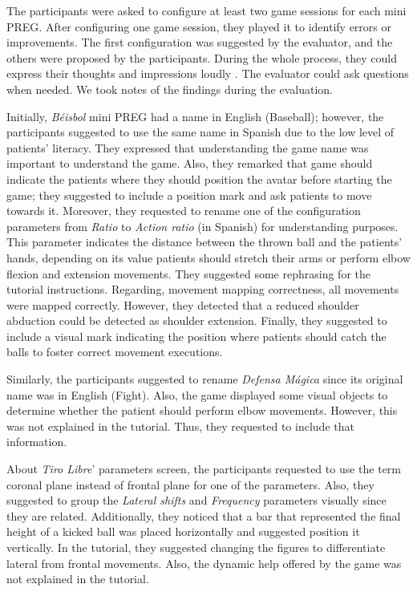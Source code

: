 The participants were asked to configure at least two game sessions for each mini \ac{PREG}. After configuring one game session, they played it to identify errors or improvements. The first configuration was suggested by the evaluator, and the others were proposed by the participants. During the whole process, they could express their thoughts and impressions loudly . The evaluator could ask questions when needed. We took notes of the findings during the evaluation.

Initially, \textit{Béisbol} mini \ac{PREG} had a name in English (Baseball); however, the participants suggested to use the same name in Spanish due to the low level of patients' literacy. They expressed that understanding the game name was important to understand the game. Also, they remarked that game should indicate the patients where they should position the avatar before starting the game; they suggested to include a position mark and ask patients to move towards it. Moreover, they requested to rename one of the configuration parameters from \textit{Ratio} to \textit{Action ratio} (in Spanish) for understanding purposes. This parameter indicates the distance between the thrown ball and the patients' hands, depending on its value patients should stretch their arms or perform elbow flexion and extension movements. They suggested some rephrasing for the tutorial instructions. Regarding, movement mapping correctness, all movements were mapped correctly. However, they detected that a reduced shoulder abduction could be detected as shoulder extension. Finally, they suggested to include a visual mark indicating the position where patients should catch the balls to foster correct movement executions.

Similarly, the participants suggested to rename \textit{Defensa M\'agica} since its original name was in English (Fight). Also, the game displayed some visual objects to determine whether the patient should perform elbow movements. However, this was not explained in the tutorial. Thus, they requested to include that information.

About \textit{Tiro Libre}' parameters screen, the participants requested to use the term coronal plane instead of frontal plane for one of the parameters. Also, they suggested to group the \textit{Lateral shifts} and \textit{Frequency} parameters visually since they are related. Additionally, they noticed that a bar that represented the final height of a kicked ball was placed horizontally and suggested position it vertically. In the tutorial, they suggested changing the figures to differentiate lateral from frontal movements. Also, the dynamic help offered by the game was not explained in the tutorial.

